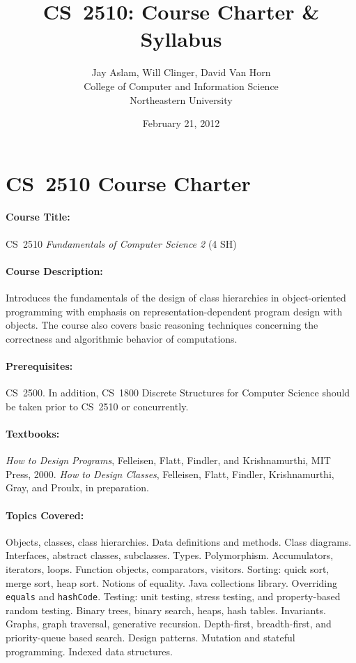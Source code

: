 \documentclass[11pt]{article}
\title{CS~2510: Course Charter \& Syllabus}
\author{Jay Aslam, Will Clinger, David Van Horn \\
        College of Computer and Information Science \\
        Northeastern University}
\date{February 21, 2012}
\begin{document}
\maketitle

\section{CS~2510 Course Charter}

\paragraph{Course Title:}
%
CS~2510 \emph{Fundamentals of Computer Science 2}	(4 SH)

\paragraph{Course Description:}
%

Introduces the fundamentals of the design of class hierarchies in
object-oriented programming with emphasis on representation-dependent
program design with objects. The course also covers basic reasoning
techniques concerning the correctness and algorithmic behavior of
computations.

\paragraph{Prerequisites:}
%
CS~2500. In addition, CS~1800 Discrete Structures for Computer Science should be taken prior to CS~2510 or concurrently.

\paragraph{Textbooks:}
%
\emph{How to Design Programs}, Felleisen, Flatt, Findler, and Krishnamurthi, MIT Press, 2000. \emph{How to Design Classes}, Felleisen, Flatt, Findler, Krishnamurthi, Gray, and Proulx, in preparation.

\paragraph{Topics Covered:}
%
Objects, classes, class hierarchies.  Data definitions and methods.
%
Class diagrams.
%
Interfaces, abstract classes, subclasses.  Types.  Polymorphism.
%
Accumulators, iterators, loops.
%
Function objects, comparators, visitors.  Sorting: quick sort, merge
sort, heap sort.  Notions of equality.
%
Java collections library.
%
Overriding {\tt equals} and {\tt hashCode}.
%
Testing: unit testing, stress testing, and property-based random testing.
%
Binary trees, binary search, heaps, hash tables.
%
Invariants.
%
Graphs, graph traversal, generative recursion.  Depth-first,
breadth-first, and priority-queue based search.
%
Design patterns.
%
Mutation and stateful programming.
%
Indexed data structures.
\end{document}
